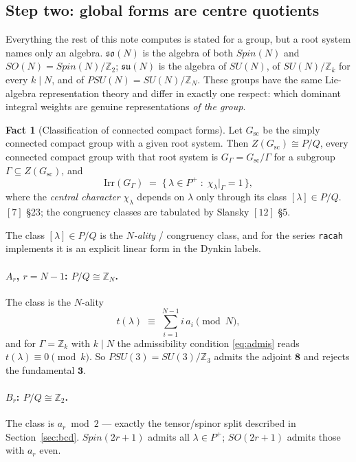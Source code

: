 \documentclass[11pt,a4paper]{article}
\theoremstyle{plain}
\theoremstyle{definition}
\newtheorem{fact}[theorem]{Fact}
\newcommand{\su}{\mathfrak{su}}
\newcommand{\so}{\mathfrak{so}}
\newcommand{\Irr}{\mathrm{Irr}}
\newcommand{\ZZ}{\mathbb{Z}}
\newcommand{\code}[1]{\texttt{#1}}
\begin{document}
\subsection{Step two: global forms are centre quotients}

Everything the rest of this note computes is stated for a group, but a root
system names only an algebra. $\so(N)$ is the algebra of both $Spin(N)$ and
$SO(N)=Spin(N)/\ZZ_2$; $\su(N)$ is the algebra of $SU(N)$, of $SU(N)/\ZZ_k$ for
every $k\mid N$, and of $PSU(N)=SU(N)/\ZZ_N$. These groups have the same
Lie-algebra representation theory and differ in exactly one respect: which
dominant integral weights are genuine representations \emph{of the group}.


\begin{fact}[Classification of connected compact forms]\label{fact:forms}
Let $G_{\mathrm{sc}}$ be the simply connected compact group with a given root
system. Then $Z(G_{\mathrm{sc}}) \cong P/Q$, every connected compact group with
that root system is $G_\Gamma = G_{\mathrm{sc}}/\Gamma$ for a subgroup
$\Gamma\subseteq Z(G_{\mathrm{sc}})$, and
\begin{equation}\label{eq:admis}
  \Irr(G_\Gamma)
  \;=\; \bigl\{\, \lambda\in P^+ \;:\; \chi_\lambda\big|_\Gamma = 1 \,\bigr\},
\end{equation}
where the \emph{central character} $\chi_\lambda$ depends on $\lambda$ only
through its class $[\lambda]\in P/Q$. $[7]$ \S23; the congruency classes are
tabulated by Slansky $[12]$ \S5.
\end{fact}

The class $[\lambda]\in P/Q$ is the \emph{$N$-ality} / congruency class, and
for the series \code{racah} implements it is an explicit linear form in the
Dynkin labels.

\paragraph{$A_{r}$, $r=N-1$: $P/Q\cong\ZZ_N$.} The class is the $N$-ality
\begin{equation}\label{eq:nality}
  t(\lambda) \;\equiv\; \sum_{i=1}^{N-1} i\,a_i \pmod N ,
\end{equation}
and for $\Gamma = \ZZ_k$ with $k\mid N$ the admissibility condition
\eqref{eq:admis} reads $t(\lambda)\equiv 0 \pmod k$. So $PSU(3)=SU(3)/\ZZ_3$
admits the adjoint $\mathbf{8}$ and rejects the fundamental $\mathbf{3}$.

\paragraph{$B_r$: $P/Q\cong\ZZ_2$.} The class is $a_r \bmod 2$ --- exactly the
tensor/spinor split described in Section~\ref{sec:bcd}. $Spin(2r+1)$ admits all
$\lambda\in P^+$; $SO(2r+1)$ admits those with $a_r$ even.
\end{document}
